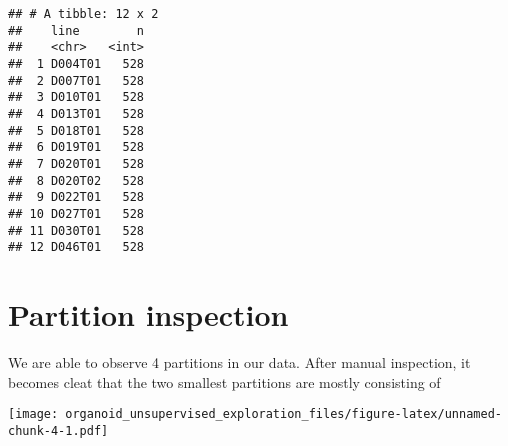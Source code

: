 \documentclass[
]{article}
\newenvironment{Shaded}{\begin{snugshade}}{\end{snugshade}}
\newcommand{\DataTypeTok}[1]{\textcolor[rgb]{0.13,0.29,0.53}{#1}}
\newcommand{\FloatTok}[1]{\textcolor[rgb]{0.00,0.00,0.81}{#1}}
\newcommand{\KeywordTok}[1]{\textcolor[rgb]{0.13,0.29,0.53}{\textbf{#1}}}
\newcommand{\NormalTok}[1]{#1}
\newcommand{\OperatorTok}[1]{\textcolor[rgb]{0.81,0.36,0.00}{\textbf{#1}}}
\newcommand{\StringTok}[1]{\textcolor[rgb]{0.31,0.60,0.02}{#1}}
\begin{document}
\begin{verbatim}
## # A tibble: 12 x 2
##    line        n
##    <chr>   <int>
##  1 D004T01   528
##  2 D007T01   528
##  3 D010T01   528
##  4 D013T01   528
##  5 D018T01   528
##  6 D019T01   528
##  7 D020T01   528
##  8 D020T02   528
##  9 D022T01   528
## 10 D027T01   528
## 11 D030T01   528
## 12 D046T01   528
\end{verbatim}

\hypertarget{partition-inspection}{%
\section{Partition inspection}\label{partition-inspection}}

We are able to observe 4 partitions in our data. After manual
inspection, it becomes cleat that the two smallest partitions are mostly
consisting of

\begin{Shaded}
\end{Shaded}

\texttt{[image: organoid\_unsupervised\_exploration\_files/figure-latex/unnamed-chunk-4-1.pdf]}

\begin{Shaded}
\end{Shaded}
\end{document}
